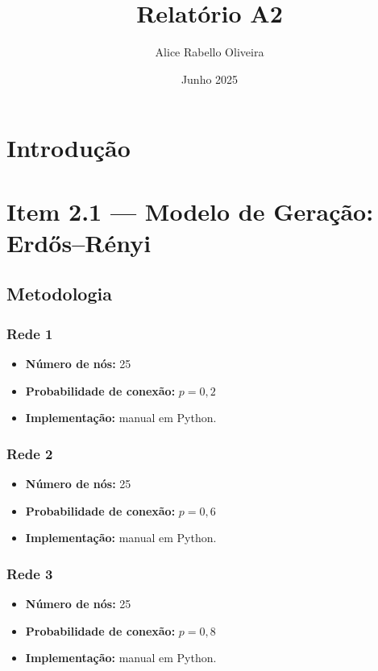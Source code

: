 \documentclass[a4paper]{article}
\title{Relatório A2}
\author{Alice Rabello Oliveira}
\date{Junho 2025}
\begin{document}
\maketitle

\section{Introdução}

\section*{Item 2.1 — Modelo de Geração: Erdős–Rényi}

\subsection*{Metodologia}

\subsubsection{Rede 1}
\begin{itemize}
    \item \textbf{Número de nós:} 25
    \item \textbf{Probabilidade de conexão:} \( p = 0{,}2 \)
    \item \textbf{Implementação:} manual em Python.
\end{itemize}

\subsubsection{Rede 2}
\begin{itemize}
    \item \textbf{Número de nós:} 25
    \item \textbf{Probabilidade de conexão:} \( p = 0{,}6  \)
    \item \textbf{Implementação:} manual em Python.
\end{itemize}

\subsubsection{Rede 3}
\begin{itemize}
    \item \textbf{Número de nós:} 25
    \item \textbf{Probabilidade de conexão:} \( p =  0{,} 8 \)
    \item \textbf{Implementação:} manual em Python.
\end{itemize}
\end{document}
